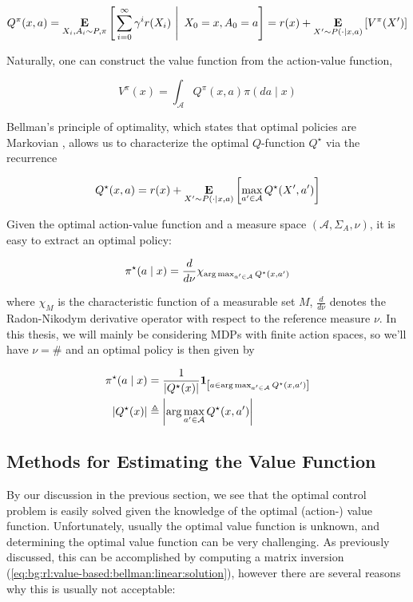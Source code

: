 \begin{equation}
  \label{eq:bg:rl:value-based:q-fn}
  Q^\pi(x, a) = \underset{X_i,A_i\sim P,
    \pi}{\mathbf{E}}\left[\left. \sum_{i=0}^\infty\gamma^ir(X_i)\ \right\rvert\ X_0 =
      x, A_0 = a\right] = r(x) + \underset{X'\sim P(\cdot\mid
    x, a)}{\mathbf{E}}\left[V^\pi(X')\right]
\end{equation}

Naturally, one can construct the value function from the action-value
function,

\begin{equation}
  \label{eq:bg:rl:value-based:v-from-q}
  V^\pi(x) = \int_{\mathcal{A}}Q^\pi(x, a)\pi(da\mid x)
\end{equation}

Bellman's principle of optimality, which states that optimal policies
are Markovian \citep{bellman1957markovian}, allows us to characterize
the optimal $Q$-function $Q^{\star}$ via the recurrence

\begin{equation}
  \label{eq:bg:rl:value-based:bellman:optimality}
  Q^\star(x, a) = r(x) + \underset{X'\sim P(\cdot\mid x,
    a)}{\mathbf{E}}\left[\max_{a'\in\mathcal{A}}Q^\star(X', a')\right]
\end{equation}

Given the optimal action-value function and a measure space
$(\mathcal{A},\Sigma_A,\nu)$, it is easy to extract an optimal policy:

\begin{equation}
  \label{eq:bg:rl:value-based:optimal-policy}
  \pi^\star(a\mid x) =
  \frac{d}{d\nu}\chi_{\arg\max_{a'\in\mathcal{A}}Q^\star(x, a')}
\end{equation}

where $\chi_M$ is the characteristic function of a measurable set $M$,
$\frac{d}{d\nu}$ denotes the Radon-Nikodym derivative operator
with respect to the reference measure $\nu$. In this thesis, we will mainly be
considering MDPs with finite action spaces, so we'll have $\nu=\#$ and an
optimal policy is then given by

\begin{align*}
  \pi^\star(a\mid x) &=
  \frac{1}{|Q^\star(x)|}\mathbf{1}_{\left[a\in\arg\max_{a'\in\mathcal{A}}Q^\star(x, a')\right]}\\
  |Q^\star(x)| &\triangleq \left\lvert\arg\max_{a'\in\mathcal{A}}Q^\star(x,
    a')\right\rvert
\end{align*}
\subsection{Methods for Estimating the Value Function}
By our discussion in the previous section, we see that the
optimal control problem is easily solved given the knowledge of
the optimal (action-) value function. Unfortunately, usually the
optimal value function is unknown, and determining the optimal value
function can be very challenging. As previously discussed, this can be
accomplished by computing a matrix inversion
(\ref{eq:bg:rl:value-based:bellman:linear:solution}), however there
are several reasons why this is usually not acceptable:

